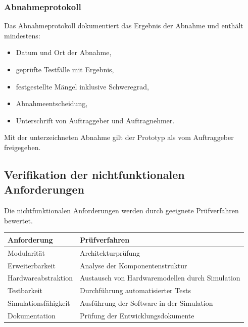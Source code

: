 \subsubsection{Abnahmeprotokoll}\label{abnahmeprotokoll}

Das Abnahmeprotokoll dokumentiert das Ergebnis der Abnahme und enthält
mindestens:

\begin{itemize}
\tightlist
\item
  Datum und Ort der Abnahme,
\item
  geprüfte Testfälle mit Ergebnis,
\item
  festgestellte Mängel inklusive Schweregrad,
\item
  Abnahmeentscheidung,
\item
  Unterschrift von Auftraggeber und Auftragnehmer.
\end{itemize}

Mit der unterzeichneten Abnahme gilt der Prototyp als vom Auftraggeber
freigegeben.

\subsection{Verifikation der nichtfunktionalen
Anforderungen}\label{verifikation-der-nichtfunktionalen-anforderungen}

Die nichtfunktionalen Anforderungen werden durch geeignete Prüfverfahren
bewertet.

\begin{longtable}[]{@{}
  >{\raggedright\arraybackslash}p{}
  >{\raggedright\arraybackslash}p{}@{}}
\toprule\noalign{}
\begin{minipage}[b]{\linewidth}\raggedright
Anforderung
\end{minipage} & \begin{minipage}[b]{\linewidth}\raggedright
Prüfverfahren
\end{minipage} \\
\midrule\noalign{}
\endhead
\bottomrule\noalign{}
\endlastfoot
Modularität & Architekturprüfung \\
Erweiterbarkeit & Analyse der Komponentenstruktur \\
Hardwareabstraktion & Austausch von Hardwaremodellen durch Simulation \\
Testbarkeit & Durchführung automatisierter Tests \\
Simulationsfähigkeit & Ausführung der Software in der Simulation \\
Dokumentation & Prüfung der Entwicklungsdokumente \\
\end{longtable}

